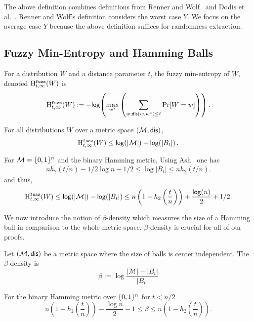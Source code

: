 The above definition combines definitions from Renner and Wolf~\cite{renner2005simple} and Dodis et al.~\cite{dodis2008fuzzy}.  Renner and Wolf's definition considers the worst case $Y$.  We focus on the average case $Y$ because the above definition suffices for randomness extraction.






\subsection{Fuzzy Min-Entropy and Hamming Balls}
\begin{definition}

For a distribution $W$ and a distance parameter $t$, the fuzzy min-entropy of $W$, denoted $\mathrm{H}^{\mathtt{fuzz}}_{t,\infty}(W)$ is 
\[
\mathrm{H}^{\mathtt{fuzz}}_{t,\infty}(W):= -\mathsf{log}\!\left( \max_{w^*} \left(\sum_{w, \mathsf{dis}(w, w^*)\le t} \Pr[W=w] \right)\right).
\]
\end{definition}

\begin{proposition} \label{lem:max fuzz ent}
For all distributions $W$ over a metric space $(\mathcal{M}, \mathsf{dis})$, 
\[\mathrm{H}^{\mathtt{fuzz}}_{t,\infty}(W) \le \mathsf{log}\!\left(|\mathcal{M}|\right) - \mathsf{log}\!\left(|B_t|\right).
\]
\end{proposition}
\noindent
For $\mathcal{M} = \{0, 1\}^n$ and the binary Hamming metric,
Using Ash~\cite[Lemma 4.7.2, Equation 4.7.5, p. 115]{ash2012information} one has
\begin{align} nh_2(t/n)  -1/2\log{n} - 1/2 \le \log{|B_t|} \le  nh_2(t/n)\label{eq:size of balls}.\end{align}
and thus, 
\[
\mathrm{H}^{\mathtt{fuzz}}_{t,\infty}(W) \le \mathsf{log}\!\left(|\mathcal{M}|\right) - \mathsf{log}\!\left(|B_t|\right)\le n\left(1-h_2\left(\frac{t}{n}\right)\right)+ \frac{\mathsf{log}\!\left(n\right)}{2} +1/2.
\]

\noindent
We now introduce the notion of $\beta$-density which measures the size of a Hamming ball in comparison to the whole metric space.  $\beta$-density is crucial for all of our proofs. 
\begin{definition}
Let $(\mathcal{M}, \mathsf{dis})$ be a metric space where the size of balls is center independent.  The $\beta$ density is
\[
\beta := \log{\frac{|\mathcal{M}|- |B_t|}{|B_t|}} 
\]
\label{def:b density}
\end{definition}
\begin{claim} 
For the binary Hamming metric over $\{0, 1\}^n$ for $t<n/2$
\[
n\left(1-h_2\left(\frac{t}{n}\right)\right)-\frac{\log{n}}{2}-1 \le \beta \le n\left(1-h_2\left(\frac{t}{n}\right)\right).
\]

\end{claim}

